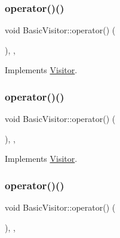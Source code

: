\subsubsection{\texorpdfstring{operator()()}{operator()()}\hspace{0.1cm}{\footnotesize\ttfamily [3/60]}}
{\footnotesize\ttfamily void Basic\+Visitor\+::operator() (\begin{DoxyParamCaption}\item[{const \hyperlink{struct_null_literal}{Null\+Literal} \&}]{ }\end{DoxyParamCaption})\hspace{0.3cm}{\ttfamily [inline]}, {\ttfamily [override]}, {\ttfamily [virtual]}}



Implements \hyperlink{struct_visitor_a2278ee24407bdc0d3addf887754d4c6c}{Visitor}.

\mbox{\label{struct_basic_visitor_a2971ac256de1c7b0206b44f888d9abd5}} 
\subsubsection{\texorpdfstring{operator()()}{operator()()}\hspace{0.1cm}{\footnotesize\ttfamily [4/60]}}
{\footnotesize\ttfamily void Basic\+Visitor\+::operator() (\begin{DoxyParamCaption}\item[{const \hyperlink{struct_boolean_literal}{Boolean\+Literal} \&}]{ }\end{DoxyParamCaption})\hspace{0.3cm}{\ttfamily [inline]}, {\ttfamily [override]}, {\ttfamily [virtual]}}



Implements \hyperlink{struct_visitor_af3b394eaf1b9b1db22379aedcb234a2f}{Visitor}.

\mbox{\label{struct_basic_visitor_a177e744fc03783b7fbb83d3292a7c029}} 
\subsubsection{\texorpdfstring{operator()()}{operator()()}\hspace{0.1cm}{\footnotesize\ttfamily [5/60]}}
{\footnotesize\ttfamily void Basic\+Visitor\+::operator() (\begin{DoxyParamCaption}\item[{const \hyperlink{struct_numeric_literal}{Numeric\+Literal} \&}]{ }\end{DoxyParamCaption})\hspace{0.3cm}{\ttfamily [inline]}, {\ttfamily [override]}, {\ttfamily [virtual]}}



